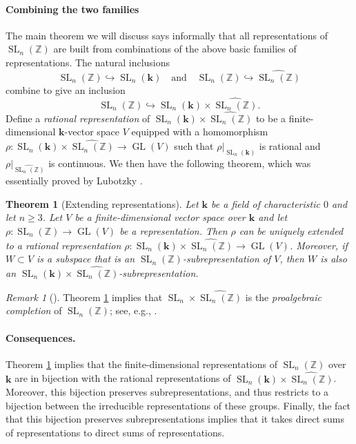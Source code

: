 \documentclass[11pt]{article}
\numberwithin{equation}{section}
\theoremstyle{plain}
\newtheorem{maintheorem}{Theorem}
\theoremstyle{definition}
\theoremstyle{remark}
\newtheorem{rmk}[theorem]{Remark}
\newenvironment{remark}[1][]{\begin{rmk}[#1] \pushQED{\qed}}{\popQED \end{rmk}}
\DeclareMathOperator{\GL}{GL}
\DeclareMathOperator{\SL}{SL}
\newcommand\Z{\ensuremath{\mathbb{Z}}}
\newcommand\bk{\ensuremath{\mathbf{k}}}
\newcommand\tSLn{\ensuremath{\widehat{\SL_n(\Z)}}}
\begin{document}
\paragraph{Combining the two families}
The main theorem we will discuss says informally that all representations of 
$\SL_n(\Z)$ are built from combinations of the above basic families of representations.
The natural inclusions
\[\SL_n(\Z) \hookrightarrow \SL_n(\bk) \quad \text{and} \quad \SL_n(\Z) \hookrightarrow \tSLn\]
combine to give an inclusion
\[\SL_n(\Z) \hookrightarrow \SL_n(\bk) \times \tSLn.\]
Define a {\em rational representation} of $\SL_n(\bk) \times \tSLn$ to be a finite-dimensional
$\bk$-vector space $V$ equipped with a homomorphism
$\rho\colon \SL_n(\bk) \times \tSLn \rightarrow \GL(V)$ such that 
$\rho|_{\SL_n(\bk)}$ is rational and $\rho|_{\tSLn}$ is
continuous.  We then have the following theorem, which was essentially proved by Lubotzky \cite{LubotzkyThesis}.

\begin{maintheorem}[Extending representations]
\label{maintheorem:lubotzky}
Let $\bk$ be a field of characteristic $0$ and let $n \geq 3$.  Let $V$ be a finite-dimensional
vector space over $\bk$ and let $\rho\colon \SL_n(\Z) \rightarrow \GL(V)$ be a representation.
Then $\rho$ can be uniquely extended to a rational representation
$\rho\colon \SL_n(\bk) \times \tSLn \rightarrow \GL(V)$.  Moreover, if $W \subset V$ is a subspace that
is an $\SL_n(\Z)$-subrepresentation of $V$, then $W$ is also an
$\SL_n(\bk) \times \tSLn$-subrepresentation.
\end{maintheorem}

\begin{remark}
Theorem \ref{maintheorem:lubotzky} implies that $\SL_n \times \tSLn$ is the {\em proalgebraic completion}
of $\SL_n(\Z)$; see, e.g., \cite{BassLubotzky}.
\end{remark}

\paragraph{Consequences.}
Theorem \ref{maintheorem:lubotzky} implies that the finite-dimensional representations of $\SL_n(\Z)$ over
$\bk$ are in bijection with the rational representations of 
$\SL_n(\bk) \times \tSLn$.  Moreover, this bijection preserves subrepresentations, and thus restricts
to a bijection between the irreducible representations of these groups.  Finally, the fact that
this bijection preserves subrepresentations implies that it takes direct sums of representations
to direct sums of representations.
\end{document}
